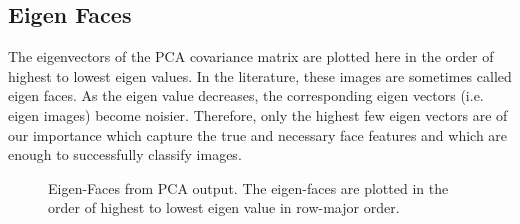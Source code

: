 \documentclass{article}
\begin{document}
\subsection{Eigen Faces}
The eigenvectors of the PCA covariance matrix are plotted here in the order of highest to lowest eigen values. In the literature, these images are sometimes called eigen faces. As the eigen value decreases, the corresponding eigen vectors (i.e. eigen images) become noisier. Therefore, only the highest few eigen vectors are of our importance which capture the true and necessary face features and which are enough to successfully classify images.
\begin{figure}[!htbp]
     \centering
     \captionsetup[subfigure]{labelformat=empty}
    \caption{Eigen-Faces from PCA output. The eigen-faces are plotted in the order of highest to lowest eigen value in row-major order.}
    \label{fig:eig_face_PCA}
\end{figure}


\newpage
\end{document}
